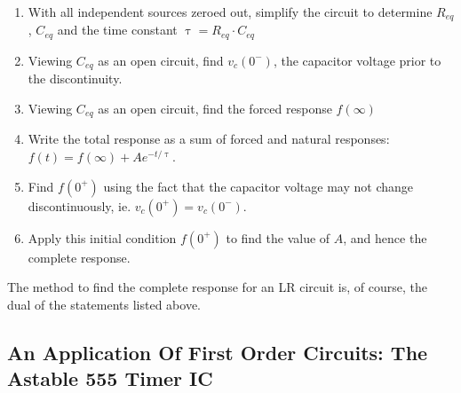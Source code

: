 \documentclass[11pt]{article}
\numberwithin{equation}{section}
\begin{document}
\begin{flushleft}
\begin{tcolorbox}[arc=0mm]
 \begin{enumerate}
  \item With all independent sources zeroed out, simplify the circuit to determine $R_{eq}$, $C_{eq}$ and the time constant $\uptau=R_{eq}\cdot C_{eq}$
  \item Viewing $C_{eq}$ as an open circuit, find $v_c(0^-)$, the capacitor voltage prior to the discontinuity.
  \item Viewing $C_{eq}$ as an open circuit, find the forced response $f(\infty)$
  \item Write the total response as a sum of forced and natural responses: $f(t) = f(\infty)+Ae^{-t/\uptau}$.
  \item Find $f(0^+)$ using the fact that the capacitor voltage may not change discontinuously, ie. $v_c(0^+)=v_c(0^-)$.
  \item Apply this initial condition $f(0^+)$ to find the value of $A$, and hence the complete response.
 \end{enumerate}
\end{tcolorbox}

The method to find the complete response for an LR circuit is, of course, the dual of the statements listed above.

\color{blue}
\subsection{An Application Of First Order Circuits: The Astable 555 Timer IC}
\color{black}


\end{flushleft}
\end{document}
